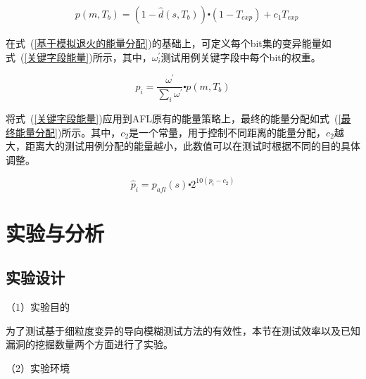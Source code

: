 \begin{equation}\label{基于模拟退火的能量分配}
\begin{aligned}
& p(m,T_{b}) = (1- \hat{d}(s,T_{b})) \centerdot (1-T_{exp}) + c_{1}T_{exp}
\end{aligned}
\end{equation}

在式~(\ref{基于模拟退火的能量分配})的基础上，可定义每个bit集的变异能量如式~(\ref{关键字段能量})所示，其中，$\omega^{'}_{i}$测试用例关键字段中每个bit的权重。

\begin{equation}\label{关键字段能量}
p_{i} = \frac{\omega^{'}}{\sum_{i} \omega^{'}} \centerdot p(m,T_{b})
\end{equation}

将式~(\ref{关键字段能量})应用到AFL原有的能量策略上，最终的能量分配如式~(\ref{最终能量分配})所示。其中，$c_{2}$是一个常量，用于控制不同距离的能量分配，$c_{2}$越大，距离大的测试用例分配的能量越小，此数值可以在测试时根据不同的目的具体调整。

\begin{equation}\label{最终能量分配}
\hat{p}_{i} = p_{afl}(s) \centerdot 2^{10(p_{i}-c_{2})}
\end{equation}

\section{实验与分析}

\subsection{实验设计}

（1）实验目的

为了测试基于细粒度变异的导向模糊测试方法的有效性，本节在测试效率以及已知漏洞的挖掘数量两个方面进行了实验。

（2）实验环境


